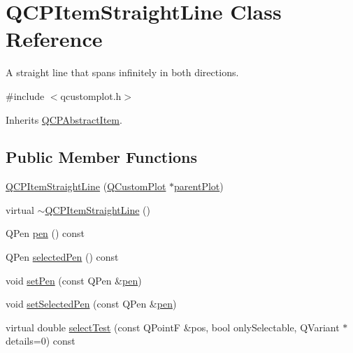 \hypertarget{class_q_c_p_item_straight_line}{\section{Q\-C\-P\-Item\-Straight\-Line Class Reference}
\label{class_q_c_p_item_straight_line}
}


A straight line that spans infinitely in both directions.  




{\ttfamily \#include $<$qcustomplot.\-h$>$}



Inherits \hyperlink{class_q_c_p_abstract_item}{Q\-C\-P\-Abstract\-Item}.

\subsection*{Public Member Functions}
\begin{DoxyCompactItemize}
\item 
\hyperlink{class_q_c_p_item_straight_line_a41fd2e1f006983449eca9830930c3b10}{Q\-C\-P\-Item\-Straight\-Line} (\hyperlink{class_q_custom_plot}{Q\-Custom\-Plot} $\ast$\hyperlink{class_q_c_p_layerable_ab7e0e94461566093d36ffc0f5312b109}{parent\-Plot})
\item 
virtual \hyperlink{class_q_c_p_item_straight_line_a1f0730759916ce203baeaad1ad2af3ea}{$\sim$\-Q\-C\-P\-Item\-Straight\-Line} ()
\item 
Q\-Pen \hyperlink{class_q_c_p_item_straight_line_ad858ab1a444391aab778f765453ea222}{pen} () const 
\item 
Q\-Pen \hyperlink{class_q_c_p_item_straight_line_a9e33ae966a7e2ea1083b3b9aeabeaea5}{selected\-Pen} () const 
\item 
void \hyperlink{class_q_c_p_item_straight_line_a9f36c9c9e60d7d9ac084c80380ac8601}{set\-Pen} (const Q\-Pen \&\hyperlink{class_q_c_p_item_straight_line_ad858ab1a444391aab778f765453ea222}{pen})
\item 
void \hyperlink{class_q_c_p_item_straight_line_a5c33559498d33543fa95cf0a36e851ff}{set\-Selected\-Pen} (const Q\-Pen \&\hyperlink{class_q_c_p_item_straight_line_ad858ab1a444391aab778f765453ea222}{pen})
\item 
virtual double \hyperlink{class_q_c_p_item_straight_line_a64cc3796f58ce856012732603edb2f1c}{select\-Test} (const Q\-Point\-F \&pos, bool only\-Selectable, Q\-Variant $\ast$details=0) const 
\end{DoxyCompactItemize}
